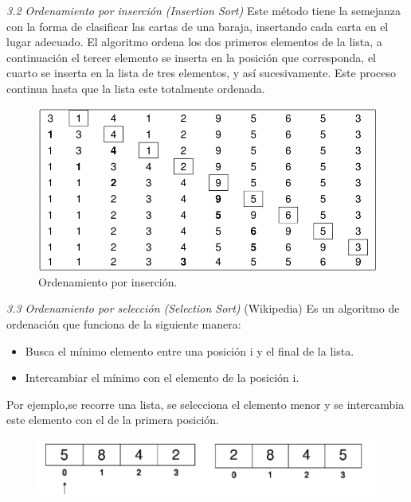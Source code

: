 \documentclass[twoside,10.5pt]{article}%
\begin{document}
\emph{3.2 Ordenamiento por inserci\'on (Insertion Sort)}
Este m\'etodo tiene la semejanza con la forma de clasificar las cartas de una baraja, insertando cada carta en el lugar adecuado. El algoritmo ordena los dos primeros elementos de la lista, a continuaci\'on el tercer elemento se inserta en la posici\'on que corresponda, el cuarto se inserta en la lista de tres elementos, y as\'i sucesivamente. Este proceso continua hasta que la lista este totalmente ordenada.

\begin{figure}[h]
   \centering
   \includegraphics[scale=.35]{insercion.png}
   \caption{Ordenamiento por inserci\'on.} 
  \end{figure}

\emph{3.3 Ordenamiento por selecci\'on (Selection Sort)}
(Wikipedia) Es un algoritmo de ordenaci\'on que funciona de la siguiente manera:

\begin{itemize}
\item Busca el m\'inimo elemento entre una posici\'on i y el final de la lista.
\item Intercambiar el m\'inimo con el elemento de la posici\'on i.
\end{itemize}

Por ejemplo,se recorre una lista, se selecciona el elemento menor y se intercambia este elemento con el de la primera posici\'on. 

\begin{figure}[h]
   \centering
   \includegraphics[scale=.35]{selec1.png}
  \end{figure}
\end{document}
